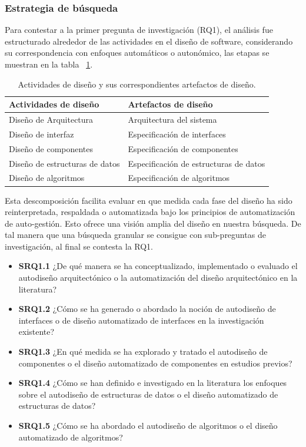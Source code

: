 \documentclass[12pt, letterpaper, oneside]{book}
\begin{document}
\subsubsection{Estrategia de búsqueda}
Para contestar a la primer pregunta de investigación (RQ1), el análisis fue estructurado alrededor de las actividades en el diseño de software, considerando su correspondencia con enfoques automáticos o autonómico, las etapas se muestran en la tabla ~\ref{tab:etapas_diseno}.

\begin{table}[H]
	\centering
	\caption{Actividades de diseño y sus correspondientes artefactos de diseño.}
	\label{tab:etapas_diseno}
	\begin{tabular}{@{}ll@{}}
		\toprule
		\textbf{Actividades de diseño} & \textbf{Artefactos de diseño} \\ \midrule
		Diseño de Arquitectura & Arquitectura del sistema\\
		Diseño de interfaz & Especificación de interfaces \\
		Diseño de componentes & Especificación de componentes\\
		Diseño de estructuras de datos & Especificación de estructuras de datos \\
		Diseño de algoritmos & Especificación de algoritmos \\
		\bottomrule
	\end{tabular}
\end{table}

Esta descomposición facilita evaluar en que medida cada fase del diseño ha sido reinterpretada, respaldada o automatizada bajo los principios de automatización de auto-gestión. Esto ofrece una visión amplia del diseño en nuestra búsqueda. De tal manera que una búsqueda granular se consigue con sub-preguntas de investigación, al final se contesta la RQ1.

\begin{itemize}
	
	\item \textbf{SRQ1.1} ¿De qué manera se ha conceptualizado, implementado o evaluado el autodiseño arquitectónico o la automatización del diseño arquitectónico en la literatura?
	
	\item \textbf{SRQ1.2} ¿Cómo se ha generado o abordado la noción de autodiseño de interfaces o de diseño automatizado de interfaces en la investigación existente?
	
	\item \textbf{SRQ1.3} ¿En qué medida se ha explorado y tratado el autodiseño de componentes o el diseño automatizado de componentes en estudios previos?
	
	\item \textbf{SRQ1.4} ¿Cómo se han definido e investigado en la literatura los enfoques sobre el autodiseño de estructuras de datos o el diseño automatizado de estructuras de datos?
	
	\item \textbf{SRQ1.5} ¿Cómo se ha abordado el autodiseño de algoritmos o el diseño automatizado de algoritmos?
	
\end{itemize}
\end{document}
